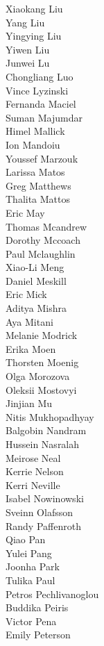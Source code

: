 Xiaokang Liu\\
Yang Liu\\
Yingying Liu\\
Yiwen Liu\\
Junwei Lu\\
Chongliang Luo\\
Vince Lyzinski\\
Fernanda Maciel\\
Suman Majumdar\\
Himel Mallick\\
Ion Mandoiu\\
Youssef Marzouk\\
Larissa Matos\\
Greg Matthews\\
Thalita Mattos\\
Eric May\\
Thomas Mcandrew\\
Dorothy Mccoach\\
Paul Mclaughlin\\
Xiao-Li Meng\\
Daniel Meskill\\
Eric Mick\\
Aditya Mishra\\
Aya Mitani\\
Melanie Modrick\\
Erika Moen\\
Thorsten Moenig\\
Olga Morozova\\
Oleksii Mostovyi\\
Jinjian Mu\\
Nitis Mukhopadhyay\\
Balgobin Nandram\\
Hussein Nasralah\\
Meirose Neal\\
Kerrie Nelson\\
Kerri Neville\\
Isabel Nowinowski\\
Sveinn Olafsson\\
Randy Paffenroth\\
Qiao Pan\\
Yulei Pang\\
Joonha Park\\
Tulika Paul\\
Petros Pechlivanoglou\\
Buddika Peiris\\
Victor Pena\\
Emily Peterson\\
